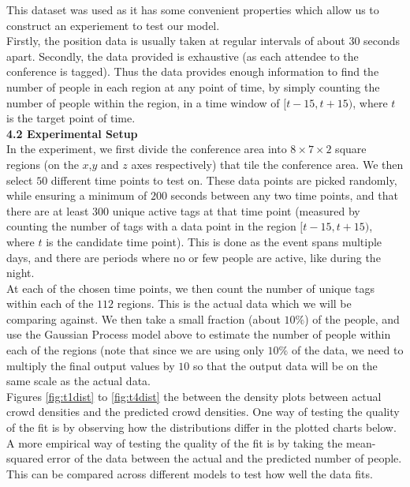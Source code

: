 \documentclass[letterpaper]{article}
\begin{document}
This dataset was used as it has some convenient properties which allow us to construct an experiement to test our model.\\

Firstly, the position data is usually taken at regular intervals of about $30$ seconds apart. Secondly, the data provided is exhaustive (as each attendee to the conference is tagged). Thus the data provides enough information to find the number of people in each region at any point of time, by simply counting the number of people within the region, in a time window of $[t-15,t+15)$, where $t$ is the target point of time. \\

{\bf4.2  Experimental Setup} \\

In the experiment, we first divide the conference area into $8\times 7 \times 2$ square regions (on the $x$,$y$ and $z$ axes respectively) that tile the conference area. We then select $50$ different time points to test on. These data points are picked randomly, while ensuring a minimum of $200$ seconds between any two time points, and that there are at least $300$ unique active tags at that time point (measured by counting the number of tags with a data point in the region $[t-15,t+15)$, where $t$ is the candidate time point). This is done as the event spans multiple days, and there are periods where no or few people are active, like during the night.\\

At each of the chosen time points, we then count the number of unique tags within each of the $112$ regions. This is the actual data which we will be comparing against. We then take a small fraction (about $10\%$) of the people, and use the Gaussian Process model above to estimate the number of people within each of the regions (note that since we are using only $10\%$ of the data, we need to multiply the final output values by $10$ so that the output data will be on the same scale as the actual data. \\

Figures \ref{fig:t1dist} to \ref{fig:t4dist} the between the density plots between actual crowd densities and the predicted crowd densities. One way of testing the quality of the fit is by observing how the distributions differ in the plotted charts below. A more empirical way of testing the quality of the fit is by taking the mean-squared error of the data between the actual and the predicted number of people. This can be compared across different models to test how well the data fits. \\
\end{document}
